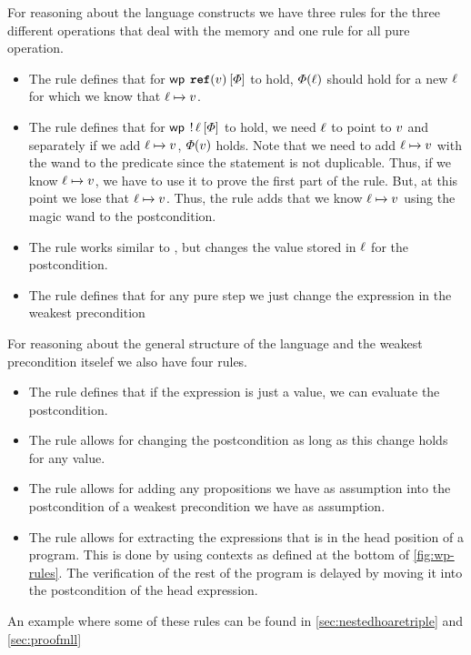 \documentclass[thesis.tex]{subfiles}
\begin{document}
For reasoning about the language constructs we have three rules for the three different operations that deal with the memory and one rule for all pure operation.
\begin{itemize}
  \item The rule  defines that for $\wpre{\Alloc(\val)}{\pred}$ to hold, $\varPhi(\ell)$ should hold for a new $\ell$ for which we know that $\loc\fmapsto\val$.
  \item The rule  defines that for $\wpre{\deref \loc}{\pred}$ to hold, we need $\ell$ to point to $v$ and separately if we add $\loc\fmapsto\val$, $\varPhi(v)$ holds. Note that we need to add $\loc\fmapsto\val$ with the wand to the predicate since the statement is not duplicable. Thus, if we know $\loc\fmapsto\val$, we have to use it to prove the first part of the  rule. But, at this point we lose that $\loc\fmapsto\val$. Thus, the  rule adds that we know $\loc\fmapsto\val$ using the magic wand to the postcondition.
  \item The rule  works similar to , but changes the value stored in $\ell$ for the postcondition.
  \item The rule  defines that for any pure step we just change the expression in the weakest precondition
\end{itemize}
For reasoning about the general structure of the language and the weakest precondition itselef we also have four rules.
\begin{itemize}
  \item The rule  defines that if the expression is just a value, we can evaluate the postcondition.
  \item The rule  allows for changing the postcondition as long as this change holds for any value.
  \item The rule  allows for adding any propositions we have as assumption into the postcondition of a weakest precondition we have as assumption.
  \item The rule  allows for extracting the expressions that is in the head position of a program. This is done by using contexts as defined at the bottom of \cref*{fig:wp-rules}. The verification of the rest of the program is delayed by moving it into the postcondition of the head expression.
\end{itemize}
An example where some of these rules can be found in \cref*{sec:nestedhoaretriple} and \cref*{sec:proofmll}
\end{document}
